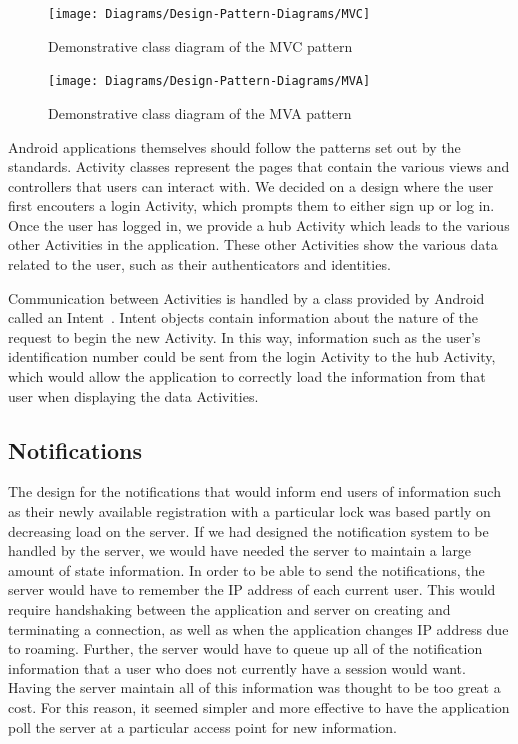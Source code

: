 \documentclass[12pt]{report}
\let\Oldsubsection\subsection
\renewcommand{\subsection}{\FloatBarrier\Oldsubsection}
\begin{document}

\begin{figure}
    \centering
    \texttt{[image: Diagrams/Design-Pattern-Diagrams/MVC]}
    \caption{Demonstrative class diagram of the MVC pattern}
    \label{fig:MVC}
\end{figure}

\begin{figure}
    \centering
    \texttt{[image: Diagrams/Design-Pattern-Diagrams/MVA]}
    \caption{Demonstrative class diagram of the MVA pattern}
    \label{fig:MVA}
\end{figure}

Android applications themselves should follow the patterns set out by the standards. Activity classes represent the
pages that contain the various views and controllers that users can interact with. We decided on a design where the user
first encouters a login Activity, which prompts them to either sign up or log in. Once the user has logged in, we
provide a hub Activity which leads to the various other Activities in the application. These other Activities show the
various data related to the user, such as their authenticators and identities.

Communication between Activities is handled by a class provided by Android called an Intent~\autocite{ANDROIDINTENT}. Intent objects contain
information about the nature of the request to begin the new Activity. In this way, information such as the user's
identification number could be sent from the login Activity to the hub Activity, which would allow the application to
correctly load the information from that user when displaying the data Activities.


\subsection{Notifications} \label{notifications}

The design for the notifications that would inform end users of information such as their newly available registration
with a particular lock was based partly on decreasing load on the server. If we had designed the notification system to
be handled by the server, we would have needed the server to maintain a large amount of state information. In order to
be able to send the notifications, the server would have to remember the IP address of each current user. This would
require handshaking between the application and server on creating and terminating a connection, as well as when the
application changes IP address due to roaming. Further, the server would have to queue up all of the notification
information that a user who does not currently have a session would want. Having the server maintain all of this
information was thought to be too great a cost. For this reason, it seemed simpler and more effective to have the
application poll the server at a particular access point for new information.
\end{document}
